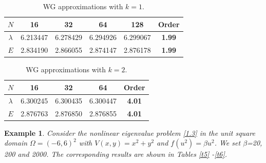 \documentclass[compress, preprint,9pt]{elsarticle}
\numberwithin{equation}{section}
\newtheorem{example}{Example}[section]
\begin{document}
\begin{table}[ht]
	\centering
	\caption{WG approximations with $k=1$.}
	\label{t3}
	\begin{tabular}{|c|c|c|c|c|c|}\hline
		$N$&16&32&64&128&Order\\ \hline\hline
		$\lambda$& 6.213447 & 6.278429 & 6.294926 & 6.299067 & \textbf{1.99} 
		\\ \hline
		$E$& 2.834190 & 2.866055 & 2.874147 & 2.876178 & \textbf{1.99}
		\\ \hline
	\end{tabular}
\end{table}
\begin{table}[ht]
	\centering
	\caption{WG approximations with $k=2$.}
	\label{t4}
	\begin{tabular}{|c|c|c|c|c|}\hline
		$N$&16&32&64&Order\\ \hline\hline
		$\lambda$& 6.300245 & 6.300435 & 6.300447 & \textbf{4.01} 
		\\ \hline
		$E$&2.876763 & 2.876850 & 2.876855 & \textbf{4.01} 
		\\ \hline
	\end{tabular}
\end{table}


\begin{example}
	Consider the nonlinear eigenvalue problem \eqref{1.3} in the unit square domain $\Omega=(-6,6)^2$ with $V(x,y)=x^2+y^2$ and $f(u^2)=\beta u^2$. We set $\beta$=20, 200 and 2000. The corresponding results are shown in Tables \ref{t5} -\ref{t6}.
\end{example}
\end{document}
